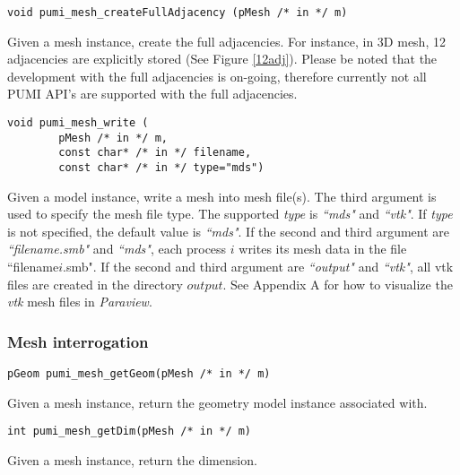 \begin{verbatim}	
void pumi_mesh_createFullAdjacency (pMesh /* in */ m)
\end{verbatim}\vspace{-.5cm}\hspace{1cm}	
Given a mesh instance, create the full adjacencies. For instance, in 3D mesh, 12 adjacencies are explicitly stored (See Figure \ref{12adj}). Please be noted that the development with the full adjacencies is on-going, therefore currently not all PUMI API's are supported with the full adjacencies.

\begin{verbatim}
void pumi_mesh_write (
        pMesh /* in */ m, 
        const char* /* in */ filename, 
        const char* /* in */ type="mds")
\end{verbatim}\vspace{-.5cm}\hspace{1cm} 
Given a model instance, write a mesh into mesh file(s). The third argument is used to specify the mesh file type. The supported \emph{type} is \emph{``mds"} and \emph{``vtk"}. If \emph{type} is not specified, the default value is \emph{``mds"}. If the second and third argument are  \emph{``filename.smb"} and \emph{``mds"}, each process $i$ writes its mesh data in the file ``filename$i$.smb". If the second and third argument are  \emph{``output"} and \emph{``vtk"}, all vtk files are created in the directory $output$. See Appendix A for how to visualize the \emph{vtk} mesh files in \emph{Paraview}.


\subsubsection{Mesh interrogation}

\begin{verbatim}
pGeom pumi_mesh_getGeom(pMesh /* in */ m)
\end{verbatim}\vspace{-.5cm}\hspace{1cm}
	Given a mesh instance, return the geometry model instance associated with.

\begin{verbatim}
int pumi_mesh_getDim(pMesh /* in */ m)
\end{verbatim}\vspace{-.5cm}\hspace{1cm}
        Given a mesh instance, return the dimension.

